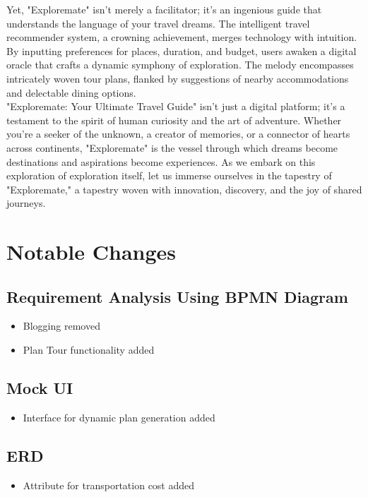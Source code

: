 \documentclass[12pt]{article}
\begin{document}
Yet, "Exploremate" isn't merely a facilitator; it's an ingenious guide that understands the language of your travel dreams. The intelligent travel recommender system, a crowning achievement, merges technology with intuition. By inputting preferences for places, duration, and budget, users awaken a digital oracle that crafts a dynamic symphony of exploration. The melody encompasses intricately woven tour plans, flanked by suggestions of nearby accommodations and delectable dining options.\\

"Exploremate: Your Ultimate Travel Guide" isn't just a digital platform; it's a testament to the spirit of human curiosity and the art of adventure. Whether you're a seeker of the unknown, a creator of memories, or a connector of hearts across continents, "Exploremate" is the vessel through which dreams become destinations and aspirations become experiences. As we embark on this exploration of exploration itself, let us immerse ourselves in the tapestry of "Exploremate," a tapestry woven with innovation, discovery, and the joy of shared journeys.\\

\newpage

\section{Notable Changes}
\subsection{Requirement Analysis Using BPMN Diagram}
\begin{itemize}
    \item Blogging removed
    \item Plan Tour functionality added
\end{itemize}
\subsection{Mock UI}
\begin{itemize}
    \item Interface for dynamic plan generation added
\end{itemize}
\subsection{ERD}
\begin{itemize}
    \item Attribute for transportation cost added
\end{itemize}
\end{document}
